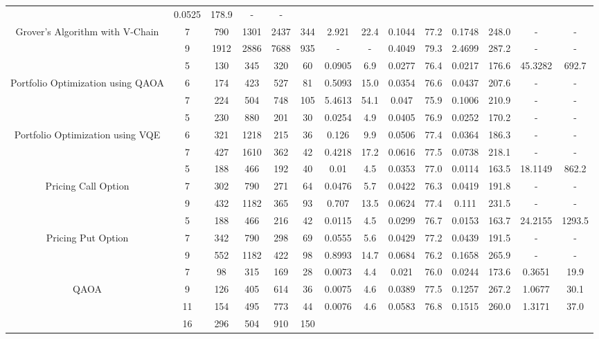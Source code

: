 \begin{table}[htb]
{\begin{tabular}{|c|c|c|c|c|c|c|c|c|c|c|c|c|c|}
 & 0.0525 & 178.9
 & - & -
 \\
Grover's Algorithm with V-Chain & 
7 & 790 & 1301 & 2437 & 344
 & 2.921 & 22.4
 & 0.1044 & 77.2
 & 0.1748 & 248.0
 & - & -
 \\
 & 
9 & 1912 & 2886 & 7688 & 935
 & - & -
 & 0.4049 & 79.3
 & 2.4699 & 287.2
 & - & -
 \\
\hline
 & 
5 & 130 & 345 & 320 & 60
 & 0.0905 & 6.9
 & 0.0277 & 76.4
 & 0.0217 & 176.6
 & 45.3282 & 692.7
 \\
Portfolio Optimization using QAOA & 
6 & 174 & 423 & 527 & 81
 & 0.5093 & 15.0
 & 0.0354 & 76.6
 & 0.0437 & 207.6
 & - & -
 \\
 & 
7 & 224 & 504 & 748 & 105
 & 5.4613 & 54.1
 & 0.047 & 75.9
 & 0.1006 & 210.9
 & - & -
 \\
\hline
 & 
5 & 230 & 880 & 201 & 30
 & 0.0254 & 4.9
 & 0.0405 & 76.9
 & 0.0252 & 170.2
 & - & -
 \\
Portfolio Optimization using VQE & 
6 & 321 & 1218 & 215 & 36
 & 0.126 & 9.9
 & 0.0506 & 77.4
 & 0.0364 & 186.3
 & - & -
 \\
 & 
7 & 427 & 1610 & 362 & 42
 & 0.4218 & 17.2
 & 0.0616 & 77.5
 & 0.0738 & 218.1
 & - & -
 \\
\hline
 & 
5 & 188 & 466 & 192 & 40
 & 0.01 & 4.5
 & 0.0353 & 77.0
 & 0.0114 & 163.5
 & 18.1149 & 862.2
 \\
Pricing Call Option & 
7 & 302 & 790 & 271 & 64
 & 0.0476 & 5.7
 & 0.0422 & 76.3
 & 0.0419 & 191.8
 & - & -
 \\
 & 
9 & 432 & 1182 & 365 & 93
 & 0.707 & 13.5
 & 0.0624 & 77.4
 & 0.111 & 231.5
 & - & -
 \\
\hline
 & 
5 & 188 & 466 & 216 & 42
 & 0.0115 & 4.5
 & 0.0299 & 76.7
 & 0.0153 & 163.7
 & 24.2155 & 1293.5
 \\
Pricing Put Option & 
7 & 342 & 790 & 298 & 69
 & 0.0555 & 5.6
 & 0.0429 & 77.2
 & 0.0439 & 191.5
 & - & -
 \\
 & 
9 & 552 & 1182 & 422 & 98
 & 0.8993 & 14.7
 & 0.0684 & 76.2
 & 0.1658 & 265.9
 & - & -
 \\
\hline
 & 
7 & 98 & 315 & 169 & 28
 & 0.0073 & 4.4
 & 0.021 & 76.0
 & 0.0244 & 173.6
 & 0.3651 & 19.9
 \\
QAOA & 
9 & 126 & 405 & 614 & 36
 & 0.0075 & 4.6
 & 0.0389 & 77.5
 & 0.1257 & 267.2
 & 1.0677 & 30.1
 \\
 & 
11 & 154 & 495 & 773 & 44
 & 0.0076 & 4.6
 & 0.0583 & 76.8
 & 0.1515 & 260.0
 & 1.3171 & 37.0
 \\
\hline
 & 
16 & 296 & 504 & 910 & 150

\end{tabular}}
\end{table}
